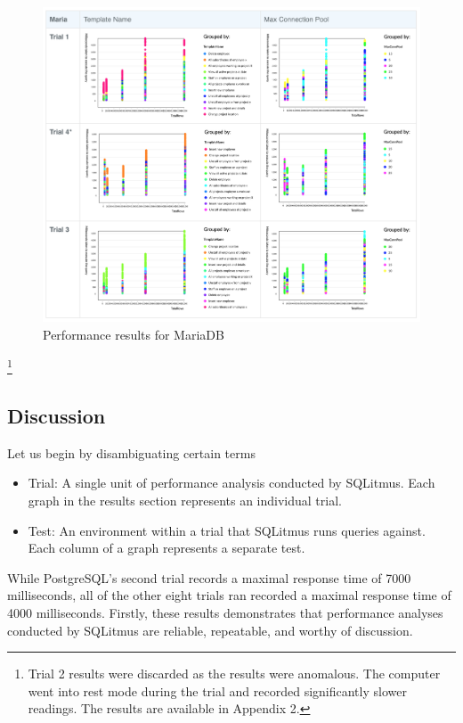 \documentclass[12pt]{article}
\begin{document}
\begin{spacing}{1.9}
\begin{figure}[H]
	\end{figure}
	
	\begin{figure}[H]
		\centering
		\includegraphics[width=\textwidth]{MARIA.png}
		\caption{Performance results for MariaDB }
		
	\end{figure}
	
	\footnote{Trial 2 results were discarded as the results were anomalous. The computer went into rest mode during the trial and recorded significantly slower readings. The results are available in Appendix 2.}
	
	\clearpage
	
	\subsection{Discussion}
	Let us begin by disambiguating certain terms
	\begin{itemize}
		\item Trial: A single unit of performance analysis conducted by SQLitmus. Each graph in the results section represents an individual trial.
		\item Test: An environment within a trial that SQLitmus runs queries against. Each column of a graph represents a separate test.
	\end{itemize}
	While PostgreSQL's second trial records a maximal response time of 7000 milliseconds,  all of the other eight trials ran recorded a maximal response time of 4000 milliseconds. Firstly, these results demonstrates that performance analyses conducted by SQLitmus are reliable, repeatable, and worthy of discussion.
	

\end{spacing}
\end{document}
